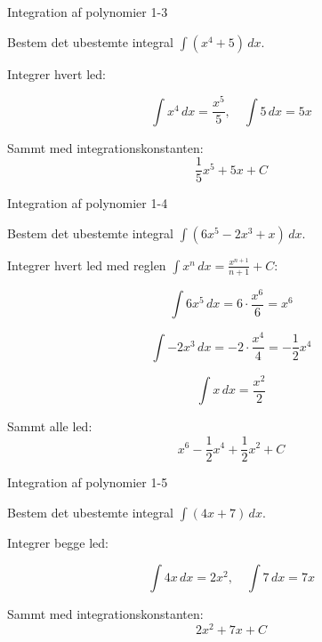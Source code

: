 \documentclass{article}
\begin{document}
\newpage

\begin{exercise}{Integration af polynomier 1-3}

Bestem det ubestemte integral $\int (x^4 + 5) \, dx$.


\hint

Integrer hvert led:

\hint
\[
\int x^4 \, dx = \frac{x^5}{5}, \quad \int 5 \, dx = 5x
\]

\hint

Sammt med integrationskonstanten:
\[
\frac{1}{5}x^5 + 5x + C
\]

\end{exercise}

\newpage

\begin{exercise}{Integration af polynomier 1-4}

Bestem det ubestemte integral $\int (6x^5 - 2x^3 + x) \, dx$.


\hint

Integrer hvert led med reglen $\int x^n \, dx = \frac{x^{n+1}}{n+1} + C$:

\hint
\[
\int 6x^5 \, dx = 6 \cdot \frac{x^6}{6} = x^6
\]

\hint
\[
\int -2x^3 \, dx = -2 \cdot \frac{x^4}{4} = -\frac{1}{2}x^4
\]

\hint
\[
\int x \, dx = \frac{x^2}{2}
\]

\hint

Sammt alle led:
\[
x^6 - \frac{1}{2}x^4 + \frac{1}{2}x^2 + C
\]

\end{exercise}

\newpage

\begin{exercise}{Integration af polynomier 1-5}

Bestem det ubestemte integral $\int (4x + 7) \, dx$.


\hint

Integrer begge led:

\hint
\[
\int 4x \, dx = 2x^2, \quad \int 7 \, dx = 7x
\]

\hint

Sammt med integrationskonstanten:
\[
2x^2 + 7x + C
\]

\end{exercise}
\end{document}

